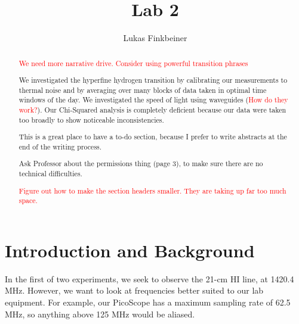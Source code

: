 \documentclass[12pt]{article}
\title{Lab 2}
\author{Lukas Finkbeiner}
\begin{document}
\maketitle

\begin{abstract}

\textcolor{red}{We need more narrative drive. Consider using powerful transition phrases}

We investigated the hyperfine hydrogen transition by calibrating our measurements to thermal noise and by averaging over many blocks of data taken in optimal time windows of the day. We investigated the speed of light using waveguides (\textcolor{red}{How do they work?}). Our Chi-Squared analysis is completely deficient because our data were taken too broadly to show noticeable inconsistencies.

This is a great place to have a to-do section, because I prefer to write abstracts at the end of the writing process.

\quad * Ask Professor about the permissions thing (page 3), to make sure there are no technical difficulties.

\textcolor{red}{Figure out how to make the section headers smaller. They are taking up far too much space.}

\end{abstract}

\section{Introduction and Background}

\quad \quad In the first of two experiments, we seek to observe the 21-cm HI line, at 1420.4 MHz. However, we want to look at frequencies better suited to our lab equipment. For example, our PicoScope has a maximum sampling rate of 62.5 MHz, so anything above 125 MHz would be aliased.
\end{document}

